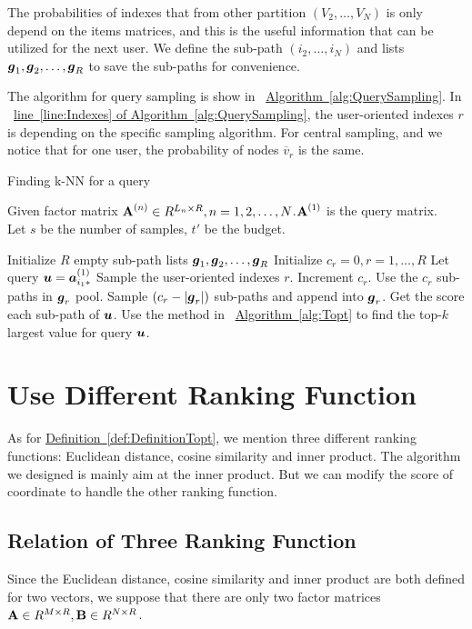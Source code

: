 \documentclass[letterpaper]{article}
\newcommand{\V}[1]{{\bm{{\MakeLowercase{#1}}}}}
\newcommand{\VnC}[3]{\V{#1}^{(#2)}_{#3}}
\newcommand{\M}[1]{{\bm{\mathbf{\MakeUppercase{#1}}}}}
\newcommand{\Def}[1] {\hyperref[def:#1] {Definition~\ref*{def:#1}}}
\newcommand{\Alg}[1] {\hyperref[alg:#1] {Algorithm~\ref*{alg:#1}}}
\newcommand{\AlgLine}[2]{\hyperref[alg:#1]{line~\ref*{line:#2} of Algorithm~\ref*{alg:#1}}}
\begin{document}
The probabilities of indexes that from other partition $(V_2,\ldots,V_N)$ is only depend on the items matrices, and this is the useful information that can be utilized for the next user. We define the sub-path $(i_2,\ldots,i_N)$ and lists $\V{g}_1,\V{g}_2,\ldots,\V{g}_R$ to save the sub-paths for convenience.

The algorithm for query sampling is show in ~\Alg{QuerySampling}.
In ~\AlgLine{QuerySampling}{Indexes}, the user-oriented indexes $r$ is depending on the
specific sampling algorithm. For central sampling, and we notice that for one user, the probability of nodes $\overline{v}_r$ is the same.



\begin{algorithm}[t]
    \caption{Finding k-NN for a query}\label{alg:QuerySampling}
        Given factor matrix $\M{A}^{(n)}\in R^{L_n\times R}, n = 1,2,\ldots,N$.$\M{A}^{(1)}$ is the query matrix.\\
        Let $s$ be the number of samples, $t'$ be the budget.
    \begin{algorithmic}[1]
    \State Initialize $R$ empty sub-path lists $\V{g}_1,\V{g}_2,\ldots,\V{g}_R$
    \State Initialize $c_r = 0,r= 1,\ldots,R$
    \State Let query $\V{u}=\VnC{a}{1}{i_1*}$
    \State Sample the user-oriented indexes $r$. \label{line:Indexes}
    \State  Increment $c_r$.
    \EndFor
    \If {$c_r\leq |\V{g}_r|$ }
    \State Use the $c_r$ sub-paths in $\V{g}_r$ pool.
    \Else
    \State Sample $(c_r - |\V{g}_r|)$ sub-paths and append into $\V{g}_r$.
    \EndIf
    \State Get the score each sub-path of $\V{u}$.
    \State Use the method in ~\Alg{Topt} to find the top-$k$ largest value for query $\V{u}$.
    \EndFor
    \EndFor
    \end{algorithmic}
\end{algorithm}


\section{Use Different Ranking Function}
As for \Def{DefinitionTopt}, we mention three different ranking functions: Euclidean distance, cosine similarity and inner product. The algorithm we designed is  mainly aim at the inner product. But we can modify the score of coordinate to handle the other ranking function.

\subsection{Relation of Three Ranking Function}
Since the Euclidean distance, cosine similarity and inner product are both defined for two vectors, we suppose that there are only two factor matrices $\M{A}\in R^{M\times R},\M{B}\in R^{N\times R}$.
\end{document}
